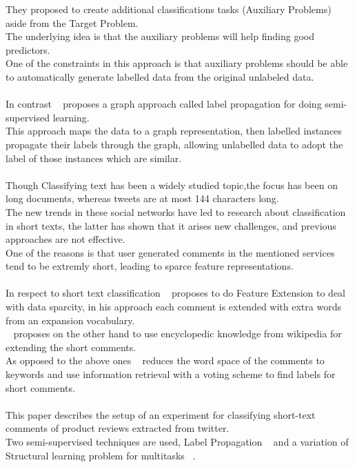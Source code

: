 \documentclass[4pt,a4paper,twocolumn]{article}
\begin{document}
They proposed to create additional classifications tasks (Auxiliary Problems) aside from the Target Problem.\\
The underlying idea is that the auxiliary problems will help finding good predictors.\\
One of the constraints in this approach is that auxiliary problems should be  able to automatically generate labelled data from the original unlabeled data.\\
\\
In contrast ~\cite{Zhu:2005:SLG:1104523} proposes a graph approach called label propagation for
doing semi-supervised learning.\\
This approach maps the data to a graph representation, then labelled instances propagate their labels through the graph, allowing unlabelled data to adopt the label of those instances which are similar.\\
\\
Though Classifying text has been a widely studied topic,the focus has been on long documents,
whereas tweets are at most 144 characters long.\\
The new trends in these social networks have led to research about classification in short texts, the latter has  shown that it arises new challenges, and previous approaches are not  effective.\\
One of the reasons is that  user generated comments in the mentioned services tend to be extremly short, leading to sparce feature representations.\\
\\
In respect to short text classification ~\cite{Fan:2010:NMC:1916732.1917677} proposes  to do Feature Extension to deal with data sparcity, in his approach each comment is extended with extra words from an expansion vocabulary.\\
~\cite{Gabrilovich:2006:OBB:1597348.1597395} proposes on the other hand to use encyclopedic knowledge from wikipedia for extending the short comments.\\
As opposed to the above ones  ~\cite{Sun:2012:STC:2348283.2348511} reduces the word space of the comments to keywords and use information retrieval with a voting scheme to find labels for short comments.\\
\\
This paper describes the setup of an experiment for classifying short-text comments of product reviews extracted from twitter.\\
Two semi-supervised techniques are used, Label Propagation ~\cite{Zhu:2005:SLG:1104523}  and  a variation of Structural learning problem for multitasks ~\cite{Ando:2005:FLP:1046920.1194905}.\\
\end{document}
